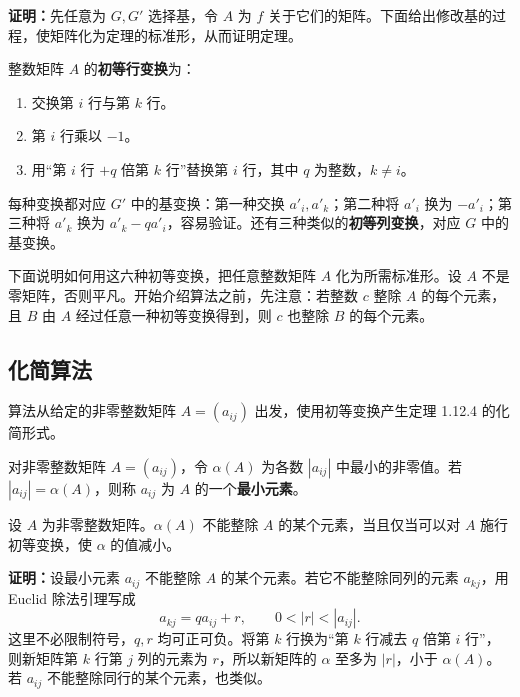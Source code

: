\noindent\textbf{证明：}先任意为 $G,G'$ 选择基，令 $A$ 为 $f$ 关于它们的矩阵。下面给出修改基的过程，使矩阵化为定理的标准形，从而证明定理。

整数矩阵 $A$ 的\textbf{初等行变换}为：
\begin{enumerate}[label=(\arabic*)]
\item 交换第 $i$ 行与第 $k$ 行。
\item 第 $i$ 行乘以 $-1$。
\item 用“第 $i$ 行 $+q$ 倍第 $k$ 行”替换第 $i$ 行，其中 $q$ 为整数，$k\ne i$。
\end{enumerate}
每种变换都对应 $G'$ 中的基变换：第一种交换 $a'_i,a'_k$；第二种将 $a'_i$ 换为 $-a'_i$；第三种将 $a'_k$ 换为 $a'_k-qa'_i$，容易验证。还有三种类似的\textbf{初等列变换}，对应 $G$ 中的基变换。

下面说明如何用这六种初等变换，把任意整数矩阵 $A$ 化为所需标准形。设 $A$ 不是零矩阵，否则平凡。开始介绍算法之前，先注意：若整数 $c$ 整除 $A$ 的每个元素，且 $B$ 由 $A$ 经过任意一种初等变换得到，则 $c$ 也整除 $B$ 的每个元素。

\subsection*{化简算法}
算法从给定的非零整数矩阵 $A=(a_{ij})$ 出发，使用初等变换产生定理 1.12.4 的化简形式。

对非零整数矩阵 $A=(a_{ij})$，令 $\alpha(A)$ 为各数 $|a_{ij}|$ 中最小的非零值。若 $|a_{ij}|=\alpha(A)$，则称 $a_{ij}$ 为 $A$ 的一个\textbf{最小元素}。

设 $A$ 为非零整数矩阵。$\alpha(A)$ 不能整除 $A$ 的某个元素，当且仅当可以对 $A$ 施行初等变换，使 $\alpha$ 的值减小。

\noindent\textbf{证明：}设最小元素 $a_{ij}$ 不能整除 $A$ 的某个元素。若它不能整除同列的元素 $a_{kj}$，用 Euclid 除法引理写成
\[
a_{kj}=qa_{ij}+r,\qquad0<|r|<|a_{ij}|.
\]
这里不必限制符号，$q,r$ 均可正可负。将第 $k$ 行换为“第 $k$ 行减去 $q$ 倍第 $i$ 行”，则新矩阵第 $k$ 行第 $j$ 列的元素为 $r$，所以新矩阵的 $\alpha$ 至多为 $|r|$，小于 $\alpha(A)$。若 $a_{ij}$ 不能整除同行的某个元素，也类似。

